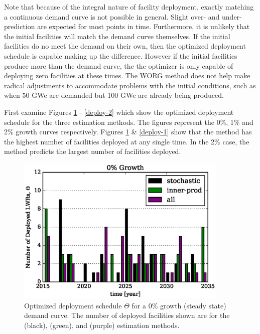 Note that because of the integral nature of facility deployment,
exactly matching a continuous demand curve is not possible in general.
Slight over- and under-prediction are expected for most points in time.
Furthermore,
it is unlikely that the initial facilities will match the demand curve
themselves. If the initial facilities do no meet the demand on their own,
then the optimized deployment schedule is capable making up the difference.
However if the initial facilities produce more than the demand curve,
the the optimizer is only capable of deploying zero facilities at these
times. The WORG method does not help make radical adjustments to
accommodate
problems with the initial conditions, such as when 50 GWe are demanded
but 100 GWe are already being produced.

First examine Figures \ref{deploy-0} - \ref{deploy-2} which
show the optimized deployment schedule for the three estimation methods.
The figures represent the 0\%, 1\% and 2\% growth curves respectively.
Figures \ref{deploy-0} \& \ref{deploy-1} show that the \stochastic method
has the highest number of facilities deployed at any single time. In the
2\% case, the \allflag method predicts the largest number of facilities
deployed.

\begin{figure}[htb]
\centering
\includegraphics[width=0.9\textwidth]{deploy-0.eps}
\caption{Optimized deployment schedule $\Theta$ for a 0\% growth (steady
state) demand curve. The number of deployed facilities shown are
for the \stochastic (black), \innerprod (green), and \allflag (purple)
estimation methods.}
\label{deploy-0}
\end{figure}

